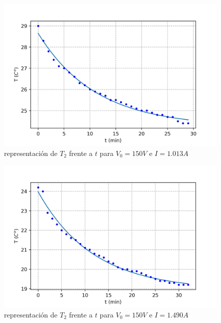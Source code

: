 \documentclass[12pt,a4paper]{article}
\begin{document}
\begin{figure}[h!] 	 \centering 
\includegraphics[scale=1.0]{plot-peltier5.png} 
\caption{representación de $T_2$ frente a $t$ para $V_0 = 150 V$ e $I = 1.013 A$} 
\label{Fig:graficapeltier6}
\end{figure} 

\begin{figure}[h!] 	 \centering 
\includegraphics[scale=1]{plot-peltier6.png} 
\caption{representación de $T_2$ frente a $t$ para $V_0 = 150 V$ e $I = 1.490 A$} 
\label{Fig:graficapeltier7}
\end{figure} 
\end{document}
